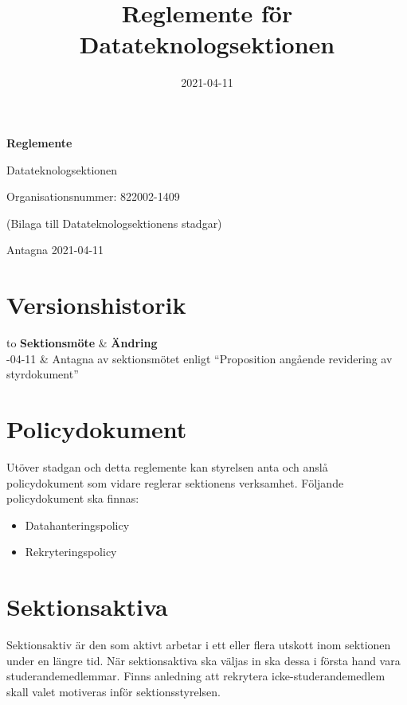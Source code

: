 \documentclass{datateknologsektionen-document}
\title{Reglemente för Datateknologsektionen}
\date{2021-04-11}
\begin{document}
\hspace{0pt}
\vfill

\begin{center}
  \Huge\textbf{Reglemente}

  \huge Datateknologsektionen

  \large
  Organisationsnummer: 822002-1409

  \vspace{4mm}
  (Bilaga till Datateknologsektionens stadgar)

  \vspace{4mm}

  Antagna 2021-04-11

\end{center}
\vfill
\hspace{0pt}
\pagebreak

\section*{Versionshistorik}
\begin{footnotesize}
  \begin{longtabu} to \linewidth { |l|X| }
    \hline
    \textbf{Sektionsmöte} & \textbf{Ändring}  \\ -04-11 & Antagna av sektionsmötet enligt ``Proposition angående revidering av styrdokument'' \\ \hline
  \end{longtabu}
\end{footnotesize}

\pagebreak
\tableofcontents

\pagebreak

\section{Policydokument}
Utöver stadgan och detta reglemente kan styrelsen anta och anslå policydokument som
vidare reglerar sektionens verksamhet. Följande policydokument ska finnas:
\begin{itemize}
  \item Datahanteringspolicy
  \item Rekryteringspolicy
\end{itemize}

\section{Sektionsaktiva}
Sektionsaktiv är den som aktivt arbetar i ett eller flera utskott inom sektionen under en längre tid.
När sektionsaktiva ska väljas in ska dessa i första hand vara studerandemedlemmar.
Finns anledning att rekrytera icke-studerandemedlem skall valet motiveras inför
sektionsstyrelsen.
\end{document}
